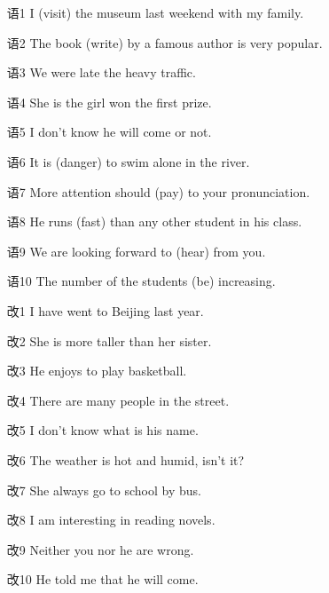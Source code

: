 \begin{enumerate}
  \item[语1] I \underline{\hspace{1cm}} (visit) the museum last weekend with my family.
  \item[语2] The book \underline{\hspace{1cm}} (write) by a famous author is very popular.
  \item[语3] We were late \underline{\hspace{1cm}} the heavy traffic.
  \item[语4] She is the girl \underline{\hspace{1cm}} won the first prize.
  \item[语5] I don't know \underline{\hspace{1cm}} he will come or not.
  \item[语6] It is \underline{\hspace{1cm}} (danger) to swim alone in the river.
  \item[语7] More attention should \underline{\hspace{1cm}} (pay) to your pronunciation.
  \item[语8] He runs \underline{\hspace{1cm}} (fast) than any other student in his class.
  \item[语9] We are looking forward to \underline{\hspace{1cm}} (hear) from you.
  \item[语10] The number of the students \underline{\hspace{1cm}} (be) increasing.
  \item[改1] I have went to Beijing last year.
  \item[改2] She is more taller than her sister.
  \item[改3] He enjoys to play basketball.
  \item[改4] There are many people in the street.
  \item[改5] I don't know what is his name.
  \item[改6] The weather is hot and humid, isn't it?
  \item[改7] She always go to school by bus.
  \item[改8] I am interesting in reading novels.
  \item[改9] Neither you nor he are wrong.
  \item[改10] He told me that he will come.
\end{enumerate}

